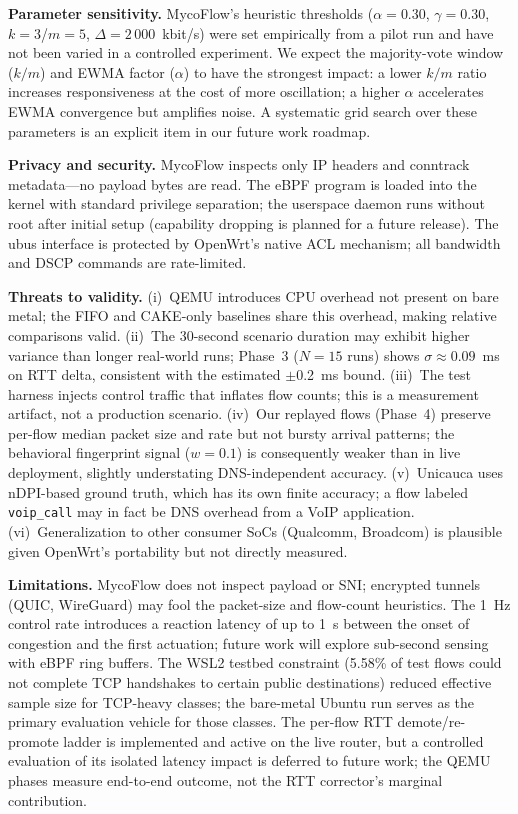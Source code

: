 \documentclass[conference]{IEEEtran}
\begin{document}
\textbf{Parameter sensitivity.}
MycoFlow's heuristic thresholds ($\alpha=0.30$, $\gamma=0.30$, $k=3$/$m=5$,
$\Delta=2$\,000~kbit/s) were set empirically from a pilot run and have not
been varied in a controlled experiment.
We expect the majority-vote window ($k/m$) and EWMA factor ($\alpha$) to
have the strongest impact: a lower $k/m$ ratio increases responsiveness at
the cost of more oscillation; a higher $\alpha$ accelerates EWMA convergence
but amplifies noise.
A systematic grid search over these parameters is an explicit item in our
future work roadmap.

\textbf{Privacy and security.}
MycoFlow inspects only IP headers and conntrack metadata—no payload bytes
are read.
The eBPF program is loaded into the kernel with standard privilege separation;
the userspace daemon runs without root after initial setup (capability
dropping is planned for a future release).
The ubus interface is protected by OpenWrt's native ACL mechanism;
all bandwidth and DSCP commands are rate-limited.

\textbf{Threats to validity.}
(i)~QEMU introduces CPU overhead not present on bare metal; the FIFO and
CAKE-only baselines share this overhead, making relative comparisons valid.
(ii)~The 30-second scenario duration may exhibit higher variance than
longer real-world runs; Phase~3 ($N{=}15$ runs) shows $\sigma{\approx}0.09$~ms
on RTT delta, consistent with the estimated $\pm$0.2~ms bound.
(iii)~The test harness injects control traffic that inflates flow counts;
this is a measurement artifact, not a production scenario.
(iv)~Our replayed flows (Phase~4) preserve per-flow median packet size and rate
but not bursty arrival patterns; the behavioral fingerprint signal ($w=0.1$)
is consequently weaker than in live deployment, slightly understating
DNS-independent accuracy.
(v)~Unicauca uses nDPI-based ground truth, which has its own finite
accuracy; a flow labeled \texttt{voip\_call} may in fact be DNS overhead
from a VoIP application.
(vi)~Generalization to other consumer SoCs (Qualcomm, Broadcom) is
plausible given OpenWrt's portability but not directly measured.

\textbf{Limitations.}
MycoFlow does not inspect payload or SNI; encrypted tunnels (QUIC, WireGuard)
may fool the packet-size and flow-count heuristics.
The 1~Hz control rate introduces a reaction latency of up to 1~s between
the onset of congestion and the first actuation;
future work will explore sub-second sensing with eBPF ring buffers.
The WSL2 testbed constraint (5.58\% of test flows could not complete
TCP handshakes to certain public destinations) reduced effective sample
size for TCP-heavy classes; the bare-metal Ubuntu run serves as the
primary evaluation vehicle for those classes.
The per-flow RTT demote/re-promote ladder is implemented and active on the
live router, but a controlled evaluation of its isolated latency impact
is deferred to future work; the QEMU phases measure end-to-end outcome,
not the RTT corrector's marginal contribution.
\end{document}
